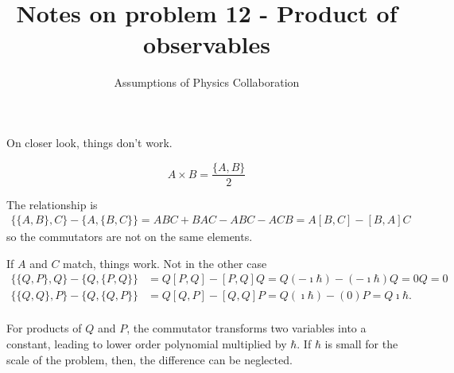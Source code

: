 \documentclass[11pt]{article}
\begin{document}
	
	
	\title{Notes on problem 12 - Product of observables}
	\author{Assumptions of Physics Collaboration}
	
	\date{}
	
	\maketitle
	
On closer look, things don't work.

\begin{equation}
	A \times B = \frac{\{A, B\}}{2}
\end{equation}	

The relationship is
\begin{equation}
	\begin{aligned}
	\{\{A, B\}, C\} - \{A, \{B, C\}\} = ABC+BAC-ABC-ACB = A[B,C] - [B,A]C
	\end{aligned}
\end{equation}
so the commutators are not on the same elements.

If $A$ and $C$ match, things work. Not in the other case
\begin{equation}
\begin{aligned}
	\{\{Q, P\}, Q\} - \{Q, \{P, Q\}\} &= Q[P,Q] - [P,Q]Q = Q (- \imath \hbar) - (-\imath \hbar)Q = 0 Q = 0 \\
	\{\{Q, Q\}, P\} - \{Q, \{Q, P\}\} &= Q[Q,P] - [Q,Q]P = Q (\imath \hbar) - (0) P = Q \imath \hbar. \\
\end{aligned}
\end{equation}

For products of $Q$ and $P$, the commutator transforms two variables into a constant, leading to lower order polynomial multiplied by $\hbar$. If $\hbar$ is small for the scale of the problem, then, the difference can be neglected.
\end{document}
